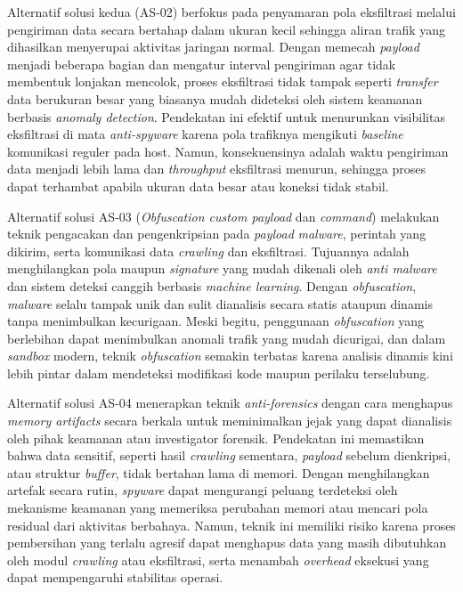 Alternatif solusi kedua (AS-02) berfokus pada penyamaran pola eksfiltrasi 
melalui pengiriman data secara bertahap dalam ukuran kecil sehingga aliran trafik 
yang dihasilkan menyerupai aktivitas jaringan normal. Dengan memecah 
\textit{payload} menjadi beberapa bagian dan mengatur interval pengiriman agar 
tidak membentuk lonjakan mencolok, proses eksfiltrasi tidak tampak seperti 
\textit{transfer} data berukuran besar yang biasanya mudah dideteksi oleh sistem 
keamanan berbasis \textit{anomaly detection}. Pendekatan ini efektif untuk 
menurunkan visibilitas eksfiltrasi di mata \textit{anti-spyware} karena pola trafiknya 
mengikuti \textit{baseline} komunikasi reguler pada host. Namun, konsekuensinya 
adalah waktu pengiriman data menjadi lebih lama dan \textit{throughput} 
eksfiltrasi menurun, sehingga proses dapat terhambat apabila ukuran data besar 
atau koneksi tidak stabil.

Alternatif solusi AS-03 (\textit{Obfuscation custom payload} dan \textit{command}) 
melakukan teknik pengacakan dan pengenkripsian pada \textit{payload} 
\textit{malware}, perintah yang dikirim, serta komunikasi data \textit{crawling} dan 
eksfiltrasi. Tujuannya adalah menghilangkan pola maupun \textit{signature} yang 
mudah dikenali oleh \textit{anti malware} dan sistem deteksi canggih berbasis 
\textit{machine learning}. Dengan \textit{obfuscation}, \textit{malware} selalu tampak 
unik dan sulit dianalisis secara statis ataupun dinamis tanpa menimbulkan 
kecurigaan. Meski begitu, penggunaan \textit{obfuscation} yang berlebihan dapat 
menimbulkan anomali trafik yang mudah dicurigai, dan dalam \textit{sandbox} 
modern, teknik \textit{obfuscation} semakin terbatas karena analisis dinamis kini 
lebih pintar dalam mendeteksi modifikasi kode maupun perilaku terselubung.

Alternatif solusi AS-04 menerapkan teknik \textit{anti-forensics} dengan cara 
menghapus \textit{memory artifacts} secara berkala untuk meminimalkan jejak yang 
dapat dianalisis oleh pihak keamanan atau investigator forensik. Pendekatan ini 
memastikan bahwa data sensitif, seperti hasil \textit{crawling} sementara, 
\textit{payload} sebelum dienkripsi, atau struktur \textit{buffer}, tidak bertahan lama di 
memori. Dengan menghilangkan artefak secara rutin, \textit{spyware} dapat 
mengurangi peluang terdeteksi oleh mekanisme keamanan yang memeriksa 
perubahan memori atau mencari pola residual dari aktivitas berbahaya. Namun, 
teknik ini memiliki risiko karena proses pembersihan yang terlalu agresif dapat 
menghapus data yang masih dibutuhkan oleh modul \textit{crawling} atau 
eksfiltrasi, serta menambah \textit{overhead} eksekusi yang dapat mempengaruhi 
stabilitas operasi.

